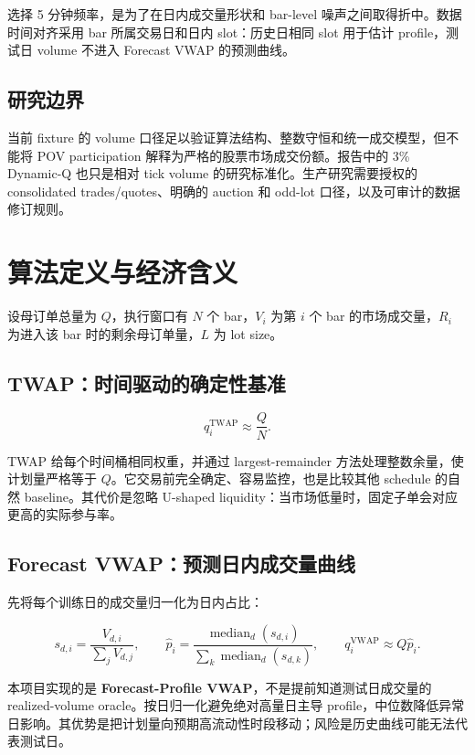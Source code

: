 \documentclass[11pt,a4paper,fontset=fandol]{ctexart}
\begin{document}
选择 5 分钟频率，是为了在日内成交量形状和 bar-level 噪声之间取得折中。数据时间对齐采用 bar 所属交易日和日内 slot：历史日相同 slot 用于估计 profile，测试日 volume 不进入 Forecast VWAP 的预测曲线。

\subsection{研究边界}

当前 fixture 的 volume 口径足以验证算法结构、整数守恒和统一成交模型，但不能将 POV participation 解释为严格的股票市场成交份额。报告中的 3\% Dynamic-Q 也只是相对 tick volume 的研究标准化。生产研究需要授权的 consolidated trades/quotes、明确的 auction 和 odd-lot 口径，以及可审计的数据修订规则。

\section{算法定义与经济含义}

设母订单总量为 $Q$，执行窗口有 $N$ 个 bar，$V_i$ 为第 $i$ 个 bar 的市场成交量，$R_i$ 为进入该 bar 时的剩余母订单量，$L$ 为 lot size。

\subsection{TWAP：时间驱动的确定性基准}

\begin{equation}
q_i^{\mathrm{TWAP}} \approx \frac{Q}{N}.
\end{equation}

TWAP 给每个时间桶相同权重，并通过 largest-remainder 方法处理整数余量，使计划量严格等于 $Q$。它交易前完全确定、容易监控，也是比较其他 schedule 的自然 baseline。其代价是忽略 U-shaped liquidity：当市场低量时，固定子单会对应更高的实际参与率。

\subsection{Forecast VWAP：预测日内成交量曲线}

先将每个训练日的成交量归一化为日内占比：

\begin{equation}
s_{d,i}=\frac{V_{d,i}}{\sum_jV_{d,j}},\qquad
\hat p_i=\frac{\operatorname{median}_d(s_{d,i})}
{\sum_k\operatorname{median}_d(s_{d,k})},\qquad
q_i^{\mathrm{VWAP}}\approx Q\hat p_i.
\end{equation}

本项目实现的是 \textbf{Forecast-Profile VWAP}，不是提前知道测试日成交量的 realized-volume oracle。按日归一化避免绝对高量日主导 profile，中位数降低异常日影响。其优势是把计划量向预期高流动性时段移动；风险是历史曲线可能无法代表测试日。
\end{document}
